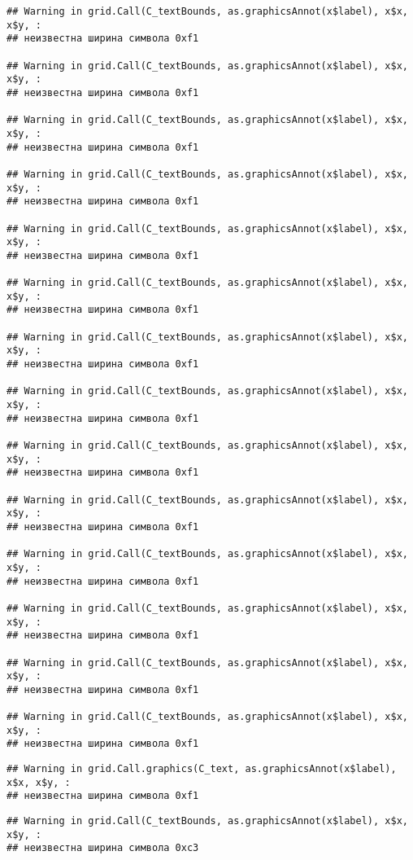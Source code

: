 \documentclass[
]{article}
\begin{document}
\begin{verbatim}
## Warning in grid.Call(C_textBounds, as.graphicsAnnot(x$label), x$x, x$y, :
## неизвестна ширина символа 0xf1

## Warning in grid.Call(C_textBounds, as.graphicsAnnot(x$label), x$x, x$y, :
## неизвестна ширина символа 0xf1

## Warning in grid.Call(C_textBounds, as.graphicsAnnot(x$label), x$x, x$y, :
## неизвестна ширина символа 0xf1

## Warning in grid.Call(C_textBounds, as.graphicsAnnot(x$label), x$x, x$y, :
## неизвестна ширина символа 0xf1

## Warning in grid.Call(C_textBounds, as.graphicsAnnot(x$label), x$x, x$y, :
## неизвестна ширина символа 0xf1

## Warning in grid.Call(C_textBounds, as.graphicsAnnot(x$label), x$x, x$y, :
## неизвестна ширина символа 0xf1

## Warning in grid.Call(C_textBounds, as.graphicsAnnot(x$label), x$x, x$y, :
## неизвестна ширина символа 0xf1

## Warning in grid.Call(C_textBounds, as.graphicsAnnot(x$label), x$x, x$y, :
## неизвестна ширина символа 0xf1

## Warning in grid.Call(C_textBounds, as.graphicsAnnot(x$label), x$x, x$y, :
## неизвестна ширина символа 0xf1

## Warning in grid.Call(C_textBounds, as.graphicsAnnot(x$label), x$x, x$y, :
## неизвестна ширина символа 0xf1

## Warning in grid.Call(C_textBounds, as.graphicsAnnot(x$label), x$x, x$y, :
## неизвестна ширина символа 0xf1

## Warning in grid.Call(C_textBounds, as.graphicsAnnot(x$label), x$x, x$y, :
## неизвестна ширина символа 0xf1

## Warning in grid.Call(C_textBounds, as.graphicsAnnot(x$label), x$x, x$y, :
## неизвестна ширина символа 0xf1

## Warning in grid.Call(C_textBounds, as.graphicsAnnot(x$label), x$x, x$y, :
## неизвестна ширина символа 0xf1
\end{verbatim}

\begin{verbatim}
## Warning in grid.Call.graphics(C_text, as.graphicsAnnot(x$label), x$x, x$y, :
## неизвестна ширина символа 0xf1
\end{verbatim}

\begin{verbatim}
## Warning in grid.Call(C_textBounds, as.graphicsAnnot(x$label), x$x, x$y, :
## неизвестна ширина символа 0xc3
\end{verbatim}
\end{document}
